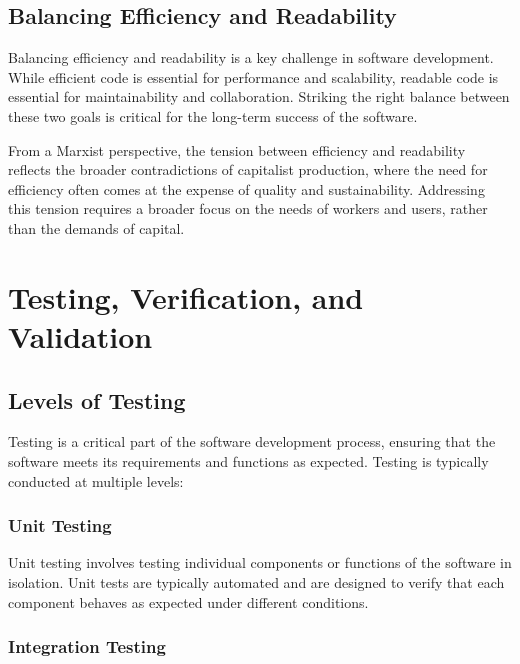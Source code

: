 \begin{refsection}
\begin{multicols}{2}
{\subsection{Balancing Efficiency and Readability}

Balancing efficiency and readability is a key challenge in software development. While efficient code is essential for performance and scalability, readable code is essential for maintainability and collaboration. Striking the right balance between these two goals is critical for the long-term success of the software.

From a Marxist perspective, the tension between efficiency and readability reflects the broader contradictions of capitalist production, where the need for efficiency often comes at the expense of quality and sustainability. Addressing this tension requires a broader focus on the needs of workers and users, rather than the demands of capital.

}
\end{multicols}
\newpage

\section{Testing, Verification, and Validation}
\begin{multicols}{2}
{\small

\subsection{Levels of Testing}

Testing is a critical part of the software development process, ensuring that the software meets its requirements and functions as expected. Testing is typically conducted at multiple levels:

\subsubsection{Unit Testing}

Unit testing involves testing individual components or functions of the software in isolation. Unit tests are typically automated and are designed to verify that each component behaves as expected under different conditions.

\subsubsection{Integration Testing}

}
\end{multicols}
\end{refsection}
